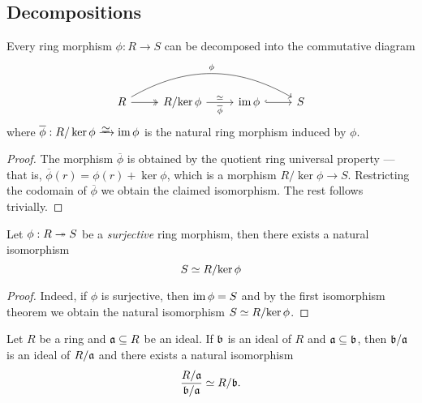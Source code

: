\subsection{Decompositions}

\begin{theorem}
    \label{thm:ring-first-isomorphism}
    Every ring morphism \(\phi: R \to S\) can be decomposed into the commutative
    diagram
    \[
        \begin{tikzcd}
            R \ar[r, two heads] \ar[rrr, bend left, "\phi"]
            &R/{\ker \phi} \ar[r, "\dis", "\overline{\phi}"']
            &\im \phi \ar[r, hook]
            &S
        \end{tikzcd}
    \]
    where \(\overline{\phi}: R/\ker \phi \isoto \im \phi\) is the natural ring
    morphism induced by \(\phi\).
\end{theorem}

\begin{proof}
    The morphism \(\overline{\phi}\) is obtained by the quotient ring universal
    property --- that is, \(\overline{\phi}(r) = \phi(r) + \ker \phi\), which is a
    morphism \(R/{\ker \phi} \to S\). Restricting the codomain of
    \(\overline{\phi}\) we obtain the claimed isomorphism. The rest follows
    trivially.
\end{proof}

\begin{corollary}
    \label{cor:isomorphism-quotient-by-kernel-of-surjective-morphism}
    Let \(\phi: R \twoheadrightarrow S\) be a \emph{surjective} ring morphism, then there exists
    a natural isomorphism
    \[
        S \simeq R/{\ker \phi}
    \]
\end{corollary}

\begin{proof}
    Indeed, if \(\phi\) is surjective, then \(\operatorname{im} \phi = S\) and by the first
    isomorphism theorem we obtain the natural isomorphism \(S \simeq R/{\ker \phi}\).
\end{proof}

\begin{proposition}
    \label{prop:ideal-of-a-quotient}
    Let \(R\) be a ring and \(\mathfrak{a} \subseteq R\) be an ideal. If \(\mathfrak{b}\)
    is an ideal of \(R\) and \(\mathfrak{a} \subseteq \mathfrak{b}\), then
    \(\mathfrak{b}/\mathfrak{a}\) is an ideal of \(R/\mathfrak{a}\) and there exists a
    natural isomorphism
    \[
        \frac{R/\mathfrak{a}}{\mathfrak{b}/\mathfrak{a}} \simeq R/\mathfrak{b}.
    \]
\end{proposition}

